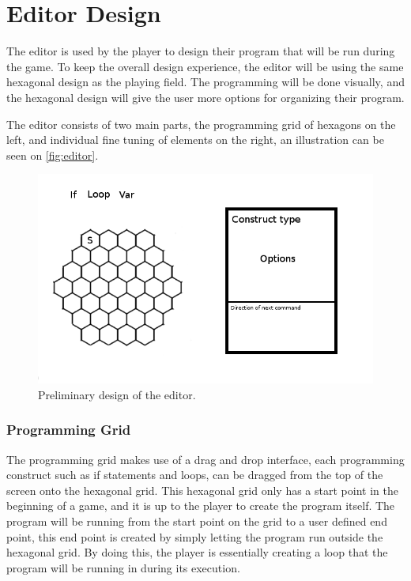 \section{Editor Design}
The editor is used by the player to design their program that will be run during the game. To keep the overall design experience, the editor will be using the same hexagonal design as the playing field. The programming will be done visually, and the hexagonal design will give the user more options for organizing their program.

The editor consists of two main parts, the programming grid of hexagons on the left, and individual fine tuning of elements on the right, an illustration can be seen on \autoref{fig:editor}.

\begin{figure}[h]
\includegraphics[width=\textwidth]{img/editor.png}
\caption{Preliminary design of the editor.}
\label{fig:editor}
\end{figure}

\subsubsection*{Programming Grid}
The programming grid makes use of a drag and drop interface, each programming construct such as if statements and loops, can be dragged from the top of the screen onto the hexagonal grid. This hexagonal grid only has a start point in the beginning of a game, and it is up to the player to create the program itself. The program will be running from the start point on the grid to a user defined end point, this end point is created by simply letting the program run outside the hexagonal grid. By doing this, the player is essentially creating a loop that the program will be running in during its execution.\newline

